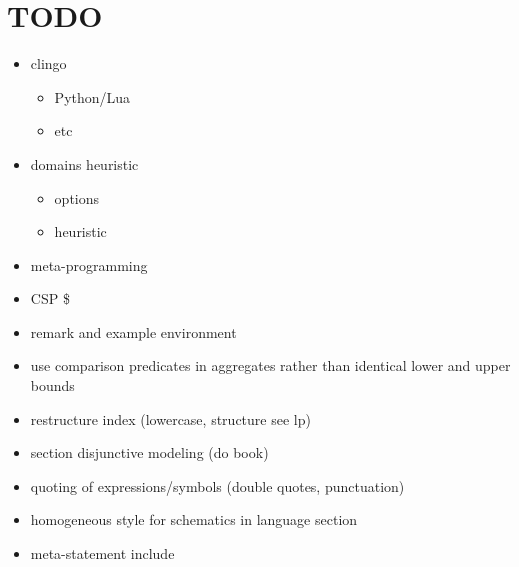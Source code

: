 \section{TODO}
\begin{itemize}
\item clingo
  \begin{itemize}
  \item Python/Lua
  \item etc
  \end{itemize}
\item domains heuristic
  \begin{itemize}
  \item options
  \item heuristic
  \end{itemize}
\item meta-programming
\item CSP \$
\item remark and example environment
\item use comparison predicates in aggregates rather than identical lower and upper bounds
\item restructure index (lowercase, structure see lp)
\item section disjunctive modeling (do book)
\item quoting of expressions/symbols (double quotes, punctuation)
\item homogeneous style for schematics in language section
\item meta-statement include
\end{itemize}

